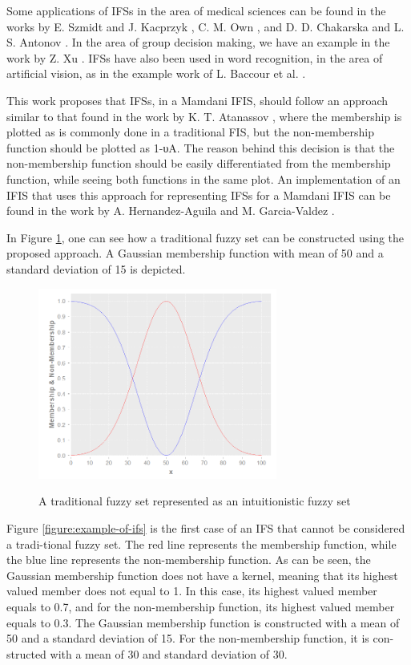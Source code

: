 Some applications of IFSs in the area of medical sciences can be found in the
works by E. Szmidt and J. Kacprzyk \cite{Szmidt2001}, C. M. Own \cite{Own2009},
and D. D. Chakarska and L. S. Antonov \cite{Antonov1995}. In the area of group
decision making, we have an example in the work by Z. Xu \cite{Xu2007}. IFSs
have also been used in word recognition, in the area of artificial vision, as in
the example work of L. Baccour et al. \cite{Baccour2008}.

This work proposes that IFSs, in a Mamdani IFIS, should follow an approach
similar to that found in the work by K. T. Atanassov \cite{Atanassov2003}, where
the membership is plotted as is commonly done in a traditional FIS, but the
non-membership function should be plotted as 1-υA. The reason behind this
decision is that the non-membership function should be easily differentiated
from the membership function, while seeing both functions in the same plot. An
implementation of an IFIS that uses this approach for representing IFSs for a
Mamdani IFIS can be found in the work by A. Hernandez-Aguila and
M. Garcia-Valdez \cite{Hernandez-aguila}.

In Figure \ref{figure:traditional-set-as-ifs}, one can see how a traditional
fuzzy set can be constructed using the proposed approach. A Gaussian membership
function with mean of 50 and a standard deviation of 15 is depicted.

\begin{figure}
\caption{A traditional fuzzy set represented as an intuitionistic fuzzy set}
\centering \includegraphics[width=0.7\textwidth]{img/traditional-set-as-ifs.png}
\label{figure:traditional-set-as-ifs}
\end{figure}

Figure \ref{figure:example-of-ifs} is the first case of an IFS that cannot be
considered a tradi-tional fuzzy set. The red line represents the membership
function, while the blue line represents the non-membership function. As can be
seen, the Gaussian membership function does not have a kernel, meaning that its
highest valued member does not equal to 1. In this case, its highest valued
member equals to 0.7, and for the non-membership function, its highest valued
member equals to 0.3. The Gaussian membership function is constructed with a
mean of 50 and a standard deviation of 15. For the non-membership function, it
is con-structed with a mean of 30 and standard deviation of 30.

